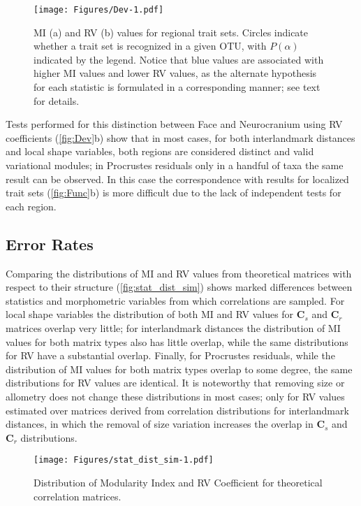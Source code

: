 \documentclass[12pt,twoside]{report}
\begin{document}
\begin{figure}[htbp]
\centering
\texttt{[image: Figures/Dev-1.pdf]}
\caption{MI (a) and RV (b) values for regional trait sets. Circles
indicate whether a trait set is recognized in a given OTU, with
$P(\alpha)$ indicated by the legend. Notice that blue values are
associated with higher MI values and lower RV values, as the alternate
hypothesis for each statistic is formulated in a corresponding manner;
see text for details. \label{fig:Dev}}
\end{figure}

Tests performed for this distinction between Face and Neurocranium using
RV coefficients (\autoref{fig:Dev}b) show that in most cases, for both
interlandmark distances and local shape variables, both regions are
considered distinct and valid variational modules; in Procrustes
residuals only in a handful of taxa the same result can be observed. In
this case the correspondence with results for localized trait sets
(\autoref{fig:Func}b) is more difficult due to the lack of independent
tests for each region.

\subsection{Error Rates}\label{error-rates}

Comparing the distributions of MI and RV values from theoretical
matrices with respect to their structure (\autoref{fig:stat_dist_sim})
shows marked differences between statistics and morphometric variables
from which correlations are sampled. For local shape variables the
distribution of both MI and RV values for $\mathbf{C}_s$ and
$\mathbf{C}_r$ matrices overlap very little; for interlandmark distances
the distribution of MI values for both matrix types also has little
overlap, while the same distributions for RV have a substantial overlap.
Finally, for Procrustes residuals, while the distribution of MI values
for both matrix types overlap to some degree, the same distributions for
RV values are identical. It is noteworthy that removing size or
allometry does not change these distributions in most cases; only for RV
values estimated over matrices derived from correlation distributions
for interlandmark distances, in which the removal of size variation
increases the overlap in $\mathbf{C}_s$ and $\mathbf{C}_r$
distributions.

\begin{figure}[htbp]
\centering
\texttt{[image: Figures/stat\_dist\_sim-1.pdf]}
\caption{Distribution of Modularity Index and RV Coefficient for
theoretical correlation matrices. \label{fig:stat_dist_sim}}
\end{figure}
\end{document}
